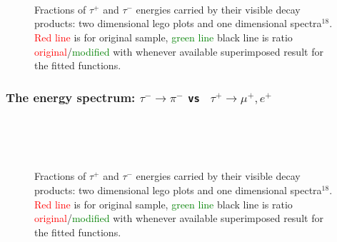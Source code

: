 \begin{figure}[h!]
\centering
{}
 \\
 \\
 \\
\caption{\small Fractions of  $\tau^+$ and $\tau^-$ energies carried by their visible  decay products:
two dimensional lego plots and one dimensional spectra$^{18}$.
\textcolor{red}{Red line} is  for original sample,
\textcolor{green}{green line} \greenlineis
black line is ratio \textcolor{red}{original}/\textcolor{green}{modified} with whenever available superimposed result for the
fitted functions.
}
\end{figure}

\newpage
\subsubsection{The energy spectrum: $\tau^- \to \pi^-$ {\tt vs } $\tau^+ \to \mu^+, e^+$}
\vspace{3\baselineskip}

\begin{figure}[h!]
\centering
{}
 \\
 \\
 \\
\caption{\small Fractions of  $\tau^+$ and $\tau^-$ energies carried by their visible  decay products:
two dimensional lego plots and one dimensional spectra$^{18}$.
\textcolor{red}{Red line} is  for original sample,
\textcolor{green}{green line} \greenlineis
black line is ratio \textcolor{red}{original}/\textcolor{green}{modified} with whenever available superimposed result for the
fitted functions.
}
\end{figure}

